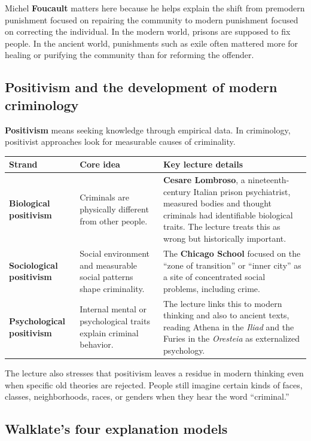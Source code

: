 \documentclass[11pt]{article}
\newcommand{\keyterm}[1]{\textbf{#1}}
\begin{document}
Michel \keyterm{Foucault} matters here because he helps explain the shift from premodern punishment focused on repairing the community to modern punishment focused on correcting the individual. In the modern world, prisons are supposed to fix people. In the ancient world, punishments such as exile often mattered more for healing or purifying the community than for reforming the offender.

\subsection*{Positivism and the development of modern criminology}
\keyterm{Positivism} means seeking knowledge through empirical data. In criminology, positivist approaches look for measurable causes of criminality.


\begin{tabularx}{\linewidth}{@{}lXX@{}}
\toprule
\textbf{Strand} & \textbf{Core idea} & \textbf{Key lecture details} \\
\midrule
\textbf{Biological positivism} & Criminals are physically different from other people. & \keyterm{Cesare Lombroso}, a nineteenth-century Italian prison psychiatrist, measured bodies and thought criminals had identifiable biological traits. The lecture treats this as wrong but historically important. \\
\textbf{Sociological positivism} & Social environment and measurable social patterns shape criminality. & The \keyterm{Chicago School} focused on the ``zone of transition'' or ``inner city'' as a site of concentrated social problems, including crime. \\
\textbf{Psychological positivism} & Internal mental or psychological traits explain criminal behavior. & The lecture links this to modern thinking and also to ancient texts, reading Athena in the \textit{Iliad} and the Furies in the \textit{Oresteia} as externalized psychology. \\
\bottomrule
\end{tabularx}

The lecture also stresses that positivism leaves a residue in modern thinking even when specific old theories are rejected. People still imagine certain kinds of faces, classes, neighborhoods, races, or genders when they hear the word ``criminal.''

\subsection*{Walklate's four explanation models}
\end{document}
